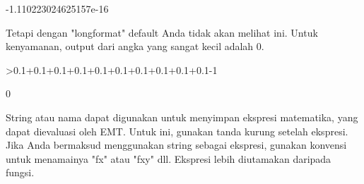 \documentclass[a4paper,10pt]{article}
\begin{document}
\begin{eulernotebook}
\begin{euleroutput}
   -1.110223024625157e-16 
\end{euleroutput}
\begin{eulercomment}
Tetapi dengan "longformat" default Anda tidak akan melihat ini. Untuk
kenyamanan, output dari angka yang sangat kecil adalah 0.
\end{eulercomment}
\begin{eulerprompt}
>0.1+0.1+0.1+0.1+0.1+0.1+0.1+0.1+0.1+0.1-1
\end{eulerprompt}
\begin{euleroutput}
  0
\end{euleroutput}
\begin{eulercomment}
String atau nama dapat digunakan untuk menyimpan ekspresi matematika,
yang dapat dievaluasi oleh EMT. Untuk ini, gunakan tanda kurung
setelah ekspresi. Jika Anda bermaksud menggunakan string sebagai
ekspresi, gunakan konvensi untuk menamainya "fx" atau "fxy" dll.
Ekspresi lebih diutamakan daripada fungsi.


\end{eulercomment}
\end{eulernotebook}
\end{document}
